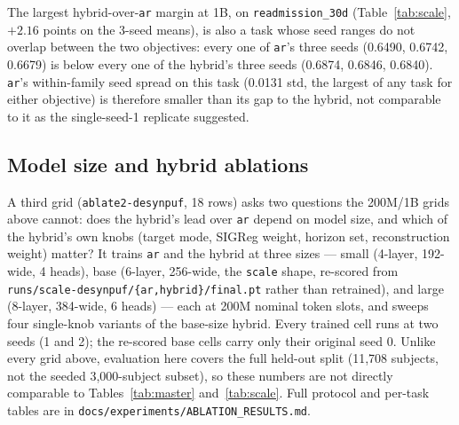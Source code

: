 \documentclass[11pt,a4paper]{article}
\newcommand{\code}[1]{\texttt{\small #1}}
\begin{document}
The largest hybrid-over-\code{ar} margin at 1B, on \code{readmission\_30d}
(Table~\ref{tab:scale}, $+2.16$ points on the 3-seed means), is also a task
whose seed ranges do not overlap between the two objectives: every one of
\code{ar}'s three seeds (0.6490, 0.6742, 0.6679) is below every one of the
hybrid's three seeds (0.6874, 0.6846, 0.6840). \code{ar}'s within-family seed
spread on this task (0.0131 std, the largest of any task for either
objective) is therefore smaller than its gap to the hybrid, not comparable to
it as the single-seed-1 replicate suggested.


\subsection{Model size and hybrid ablations}
\label{sec:ablate2}

A third grid (\code{ablate2-desynpuf}, 18 rows) asks two questions the 200M/1B
grids above cannot: does the hybrid's lead over \code{ar} depend on model
size, and which of the hybrid's own knobs (target mode, SIGReg weight,
horizon set, reconstruction weight) matter? It trains \code{ar} and the
hybrid at three sizes --- small (4-layer, 192-wide, 4 heads), base (6-layer,
256-wide, the \code{scale} shape, re-scored from
\code{runs/scale-desynpuf/\{ar,hybrid\}/final.pt} rather than retrained), and
large (8-layer, 384-wide, 6 heads) --- each at 200M nominal token slots, and
sweeps four single-knob variants of the base-size hybrid. Every trained cell
runs at two seeds (1 and 2); the re-scored base cells carry only their
original seed 0. Unlike every grid above, evaluation here covers the full
held-out split (11{,}708 subjects, not the seeded 3{,}000-subject subset), so
these numbers are not directly comparable to Tables~\ref{tab:master}
and~\ref{tab:scale}. Full protocol and per-task tables are in
\code{docs/experiments/ABLATION\_RESULTS.md}.
\end{document}
